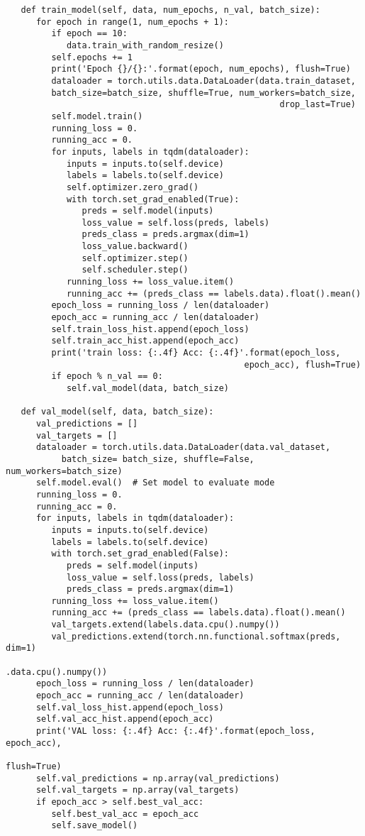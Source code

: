 \begin{verbatim}
   def train_model(self, data, num_epochs, n_val, batch_size):
      for epoch in range(1, num_epochs + 1):
         if epoch == 10:
            data.train_with_random_resize()
         self.epochs += 1
         print('Epoch {}/{}:'.format(epoch, num_epochs), flush=True)
         dataloader = torch.utils.data.DataLoader(data.train_dataset,
         batch_size=batch_size, shuffle=True, num_workers=batch_size,
                                                      drop_last=True)
         self.model.train() 
         running_loss = 0.
         running_acc = 0.
         for inputs, labels in tqdm(dataloader):
            inputs = inputs.to(self.device)
            labels = labels.to(self.device)
            self.optimizer.zero_grad()
            with torch.set_grad_enabled(True):
               preds = self.model(inputs)
               loss_value = self.loss(preds, labels)
               preds_class = preds.argmax(dim=1)
               loss_value.backward()
               self.optimizer.step()
               self.scheduler.step()
            running_loss += loss_value.item()
            running_acc += (preds_class == labels.data).float().mean()
         epoch_loss = running_loss / len(dataloader)
         epoch_acc = running_acc / len(dataloader)
         self.train_loss_hist.append(epoch_loss)
         self.train_acc_hist.append(epoch_acc)
         print('train loss: {:.4f} Acc: {:.4f}'.format(epoch_loss,
                                               epoch_acc), flush=True)         
         if epoch % n_val == 0:
            self.val_model(data, batch_size)

   def val_model(self, data, batch_size):
      val_predictions = []
      val_targets = []
      dataloader = torch.utils.data.DataLoader(data.val_dataset,
           batch_size= batch_size, shuffle=False, num_workers=batch_size)
      self.model.eval()  # Set model to evaluate mode
      running_loss = 0.
      running_acc = 0.
      for inputs, labels in tqdm(dataloader):
         inputs = inputs.to(self.device)
         labels = labels.to(self.device)
         with torch.set_grad_enabled(False):
            preds = self.model(inputs)
            loss_value = self.loss(preds, labels)
            preds_class = preds.argmax(dim=1)
         running_loss += loss_value.item()
         running_acc += (preds_class == labels.data).float().mean()
         val_targets.extend(labels.data.cpu().numpy())
         val_predictions.extend(torch.nn.functional.softmax(preds, dim=1)
                                                     .data.cpu().numpy())
      epoch_loss = running_loss / len(dataloader)
      epoch_acc = running_acc / len(dataloader)
      self.val_loss_hist.append(epoch_loss)
      self.val_acc_hist.append(epoch_acc)
      print('VAL loss: {:.4f} Acc: {:.4f}'.format(epoch_loss, epoch_acc),
                                                              flush=True)
      self.val_predictions = np.array(val_predictions)
      self.val_targets = np.array(val_targets)
      if epoch_acc > self.best_val_acc:
         self.best_val_acc = epoch_acc
         self.save_model()


\end{verbatim}
